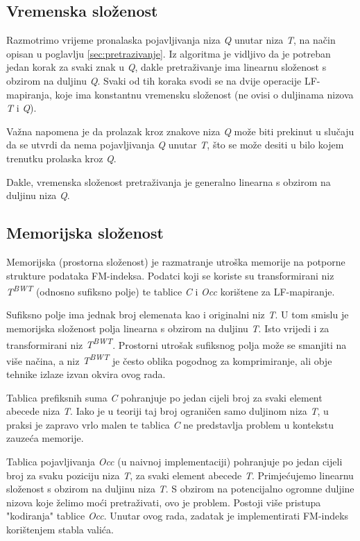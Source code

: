 \documentclass[times, utf8, seminar, numeric]{fer}
\begin{document}
\subsection{Vremenska složenost}

Razmotrimo vrijeme pronalaska pojavljivanja niza \textit{Q} unutar niza \textit{T}, na
način opisan u poglavlju \ref{sec:pretrazivanje}. Iz algoritma je vidljivo da je
potreban jedan korak za svaki znak u \textit{Q}, dakle pretraživanje ima linearnu
složenost s obzirom na duljinu \textit{Q}. Svaki od tih koraka svodi se na dvije
operacije LF-mapiranja, koje ima konstantnu vremensku složenost (ne ovisi o duljinama
nizova \textit{T} i \textit{Q}).

Važna napomena je da prolazak kroz znakove niza \textit{Q} može biti prekinut u slučaju
da se utvrdi da nema pojavljivanja \textit{Q} unutar \textit{T}, što se može desiti
u bilo kojem trenutku prolaska kroz \textit{Q}.

Dakle, vremenska složenost pretraživanja je generalno linearna s obzirom na duljinu
niza \textit{Q}.

\subsection{Memorijska složenost}

Memorijska (prostorna složenost) je razmatranje utroška memorije na potporne
strukture podataka FM-indeksa. Podatci koji se koriste su transformirani niz
\textit{T\textsuperscript{BWT}} (odnosno sufiksno polje) te tablice \textit{C}
i \textit{Occ} korištene za LF-mapiranje.

Sufiksno polje ima jednak broj elemenata kao i originalni niz \textit{T}. U
tom smislu je memorijska složenost polja linearna s obzirom na duljinu \textit{T}.
Isto vrijedi i za transformirani niz \textit{T\textsuperscript{BWT}}. Prostorni
utrošak sufiksnog polja može se smanjiti na više načina, a niz \textit{T\textsuperscript{BWT}}
je često oblika pogodnog za komprimiranje, ali obje tehnike izlaze izvan okvira
ovog rada.

Tablica prefiksnih suma \textit{C} pohranjuje po jedan cijeli broj za svaki
element abecede niza \textit{T}. Iako je u teoriji taj broj ograničen samo
duljinom niza \textit{T}, u praksi je zapravo vrlo malen te tablica \textit{C}
ne predstavlja problem u kontekstu zauzeća memorije.

Tablica pojavljivanja \textit{Occ} (u naivnoj implementaciji) pohranjuje po
jedan cijeli broj za svaku poziciju niza \textit{T}, za svaki element abecede \textit{T}.
Primjećujemo linearnu složenost s obzirom na duljinu niza \textit{T}. S obzirom
na potencijalno ogromne duljine nizova koje želimo moći pretraživati, ovo je problem.
Postoji više pristupa "kodiranja" tablice \textit{Occ}. Unutar ovog rada, zadatak
je implementirati FM-indeks korištenjem stabla valića.
\end{document}
